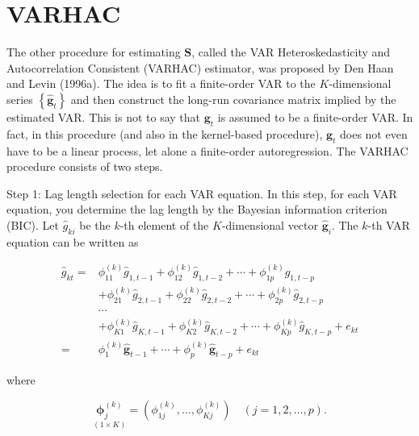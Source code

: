 \documentclass[10pt]{article}
\begin{document}
\section*{VARHAC}
The other procedure for estimating $\mathbf{S}$, called the VAR Heteroskedasticity and Autocorrelation Consistent (VARHAC) estimator, was proposed by Den Haan and Levin (1996a). The idea is to fit a finite-order VAR to the $K$-dimensional series $\left\{\hat{\mathbf{g}}_{t}\right\}$ and then construct the long-run covariance matrix implied by the estimated VAR. This is not to say that $\mathbf{g}_{t}$ is assumed to be a finite-order VAR. In fact, in this procedure (and also in the kernel-based procedure), $\mathbf{g}_{t}$ does not even have to be a linear process, let alone a finite-order autoregression. The VARHAC procedure consists of two steps.

Step 1: Lag length selection for each VAR equation. In this step, for each VAR equation, you determine the lag length by the Bayesian information criterion (BIC). Let $\hat{g}_{k i}$ be the $k$-th element of the $K$-dimensional vector $\hat{\mathbf{g}}_{i}$. The $k$-th VAR equation can be written as


\begin{align*}
\hat{g}_{k t}= & \phi_{11}^{(k)} \hat{g}_{1, t-1}+\phi_{12}^{(k)} \hat{g}_{1, t-2}+\cdots+\phi_{1 p}^{(k)} \hat{g}_{1, t-p} \\
& +\phi_{21}^{(k)} \hat{g}_{2, t-1}+\phi_{22}^{(k)} \hat{g}_{2, t-2}+\cdots+\phi_{2 p}^{(k)} \hat{g}_{2, t-p} \\
& \cdots \\
& +\phi_{K 1}^{(k)} \hat{g}_{K, t-1}+\phi_{K 2}^{(k)} \hat{g}_{K, t-2}+\cdots+\phi_{K p}^{(k)} \hat{g}_{K, t-p}+e_{k t} \\
= & \phi_{1}^{(k)} \hat{\mathbf{g}}_{t-1}+\cdots+\phi_{p}^{(k)} \hat{\mathbf{g}}_{t-p}+e_{k t} \tag{6.6.10}
\end{align*}


where

$$
\underset{(1 \times K)}{\boldsymbol{\phi}_{j}^{(k)}}=\left(\phi_{1 j}^{(k)}, \ldots, \phi_{K j}^{(k)}\right) \quad(j=1,2, \ldots, p) .
$$
\end{document}
